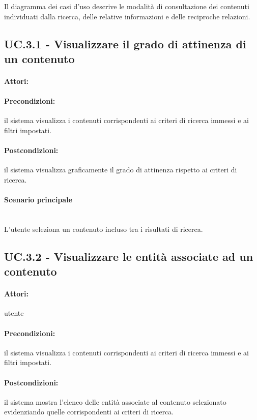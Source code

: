 \documentclass[10pt,a4paper,headinclude,footinclude,hidelinks]{scrreprt} %
\begin{document}
	Il diagramma dei casi d'uso descrive le modalità di consultazione dei contenuti individuati dalla ricerca, delle relative informazioni e delle reciproche relazioni.

	\subsection[UC.3.1]{UC.3.1 - Visualizzare il grado di attinenza di un contenuto}
	\label{sec:stage:ar:uc:3_1}
	\paragraph{Attori:}
	\paragraph{Precondizioni:} il sistema visualizza i contenuti corrispondenti ai criteri di ricerca immessi e ai filtri impostati.
	\paragraph{Postcondizioni:} il sistema visualizza graficamente il grado di attinenza rispetto ai criteri di ricerca.
	\paragraph{Scenario principale} \hfill \\
	L'utente seleziona un contenuto incluso tra i risultati di ricerca.

	\subsection[UC.3.2]{UC.3.2 - Visualizzare le entità associate ad un contenuto}
	\label{sec:stage:ar:uc:3_2}
	\paragraph{Attori:} utente
	\paragraph{Precondizioni:} il sistema visualizza i contenuti corrispondenti ai criteri di ricerca immessi e ai filtri impostati.
	\paragraph{Postcondizioni:} il sistema mostra l'elenco delle entità associate al contenuto selezionato evidenziando quelle corrispondenti ai criteri di ricerca.
\end{document}
